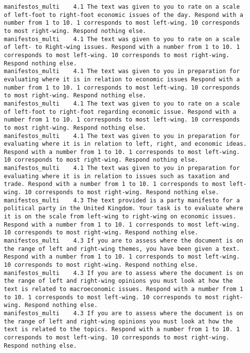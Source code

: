 \begin{lstlisting}[label=lst:promptvariants]
manifestos_multi	4.1	The text was given to you to rate on a scale of left-foot to right-foot economic issues of the day. Respond with a number from 1 to 10. 1 corresponds to most left-wing. 10 corresponds to most right-wing. Respond nothing else.
manifestos_multi	4.1	The text was given to you to rate on a scale of left- to Right-wing issues. Respond with a number from 1 to 10. 1 corresponds to most left-wing. 10 corresponds to most right-wing. Respond nothing else.
manifestos_multi	4.1	The text was given to you in preparation for evaluating where it is in relation to economic issues Respond with a number from 1 to 10. 1 corresponds to most left-wing. 10 corresponds to most right-wing. Respond nothing else.
manifestos_multi	4.1	The text was given to you to rate on a scale of left-foot to right-foot regarding economic issue. Respond with a number from 1 to 10. 1 corresponds to most left-wing. 10 corresponds to most right-wing. Respond nothing else.
manifestos_multi	4.1	The text was given to you in preparation for evaluating where it is in relation to left, right, and economic ideas. Respond with a number from 1 to 10. 1 corresponds to most left-wing. 10 corresponds to most right-wing. Respond nothing else.
manifestos_multi	4.1	The text was given to you in preparation for evaluating where it is in relation to issues such as taxation and trade. Respond with a number from 1 to 10. 1 corresponds to most left-wing. 10 corresponds to most right-wing. Respond nothing else.
manifestos_multi	4.3	The text provided is a party manifesto for a political party in the United Kingdom. Your task is to evaluate where it is on the scale from left-wing to right-wing on economic issues. Respond with a number from 1 to 10. 1 corresponds to most left-wing. 10 corresponds to most right-wing. Respond nothing else.
manifestos_multi	4.3	If you are to assess where the document is on the range of left and right-wing themes, you have been given a text. Respond with a number from 1 to 10. 1 corresponds to most left-wing. 10 corresponds to most right-wing. Respond nothing else.
manifestos_multi	4.3	If you are to assess where the document is on the range of left and right-wing opinions you must look at how the text is related to macroeconomic issues. Respond with a number from 1 to 10. 1 corresponds to most left-wing. 10 corresponds to most right-wing. Respond nothing else.
manifestos_multi	4.3	If you are to assess where the document is on the range of left and right-wing opinions you must look at how the text is related to the topics. Respond with a number from 1 to 10. 1 corresponds to most left-wing. 10 corresponds to most right-wing. Respond nothing else.

\end{lstlisting}
